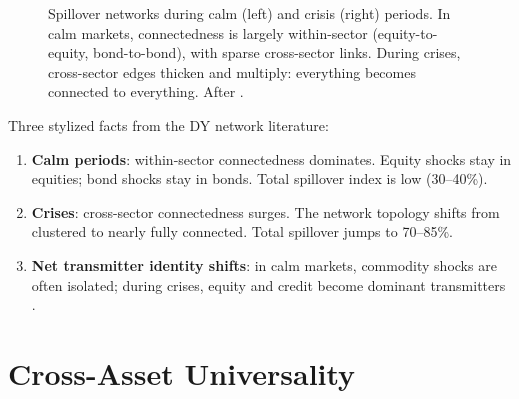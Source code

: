 \begin{figure}[ht]
\caption{Spillover networks during calm (left) and crisis (right) periods.
In calm markets, connectedness is largely within-sector (equity-to-equity,
bond-to-bond), with sparse cross-sector links.  During crises, cross-sector edges
thicken and multiply: everything becomes connected to everything.
After \citet{DemirerDieboldLiuYilmaz2018}.}
\label{fig:calm-vs-crisis}
\end{figure}

\begin{keyidea}
Three stylized facts from the DY network literature:
\begin{enumerate}[nosep]
  \item \textbf{Calm periods}: within-sector connectedness dominates.  Equity shocks
        stay in equities; bond shocks stay in bonds.  Total spillover index is low
        (30--40\%).
  \item \textbf{Crises}: cross-sector connectedness surges.  The network topology
        shifts from clustered to nearly fully connected.  Total spillover jumps to
        70--85\%.
  \item \textbf{Net transmitter identity shifts}: in calm markets, commodity shocks
        are often isolated; during crises, equity and credit become dominant
        transmitters \citep{DieboldYilmaz2014}.
\end{enumerate}
\end{keyidea}


\section{Cross-Asset Universality}\label{sec:universality}

